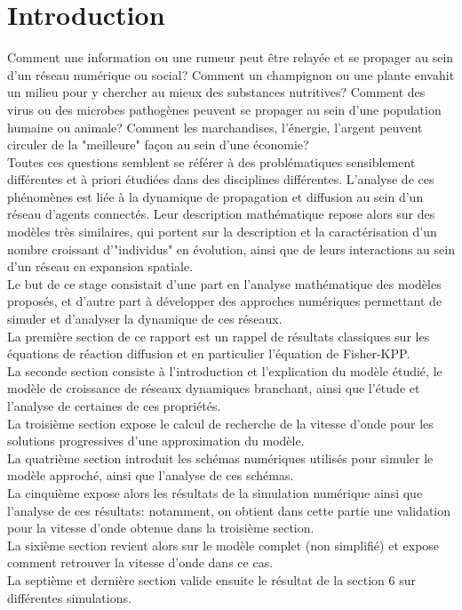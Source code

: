 \documentclass[11pt]{article}
\begin{document}
\fi

\section{Introduction}


Comment une information ou une rumeur peut être relayée et se propager au sein d'un réseau numérique ou social? Comment un champignon ou une plante envahit un milieu pour y chercher au mieux des substances nutritives? Comment des virus ou des microbes pathogènes peuvent se propager au sein d'une population humaine ou animale? Comment les marchandises, l'énergie, l'argent peuvent circuler de la "meilleure" façon au sein d'une économie? \\
Toutes ces questions semblent se référer à des problématiques sensiblement différentes et à priori étudiées dans des disciplines différentes. L'analyse de ces phénomènes est liée à la dynamique de propagation et diffusion au sein d'un réseau d'agents connectés.  Leur description mathématique repose alors sur des modèles très similaires, qui portent sur la description et la caractérisation d'un nombre croissant d'"individus" en évolution, ainsi que de leurs interactions au sein d'un réseau en expansion spatiale. \\
Le but de ce stage consistait d'une part en l'analyse mathématique des modèles proposés, et d'autre part à développer des approches numériques permettant de simuler et d'analyser la dynamique de ces réseaux. \\
La première section de ce rapport est un rappel de résultats classiques sur les équations de réaction diffusion et en particulier l’équation de Fisher-KPP.\\ La seconde section consiste à l'introduction et l'explication du modèle étudié, le modèle de croissance de réseaux dynamiques branchant, ainsi que l’étude et l'analyse de certaines de ces propriétés. \\ La troisième section expose le calcul de recherche de la vitesse d'onde pour les solutions progressives d'une approximation du modèle.\\ La quatrième section introduit les schémas numériques utilisés pour simuler le modèle approché, ainsi que l'analyse de ces schémas.\\ 
La cinquième expose alors les résultats de la simulation numérique ainsi que l'analyse de ces résultats: notamment, on obtient dans cette partie une validation pour la vitesse d'onde obtenue dans la troisième section. \\
La sixième section revient alors sur le modèle complet (non simplifié) et expose comment retrouver la vitesse d'onde dans ce cas.\\
La septième et dernière section valide ensuite le résultat de la section 6 sur différentes simulations.









\ifdefined\COMPLETE
\else
\end{document}
